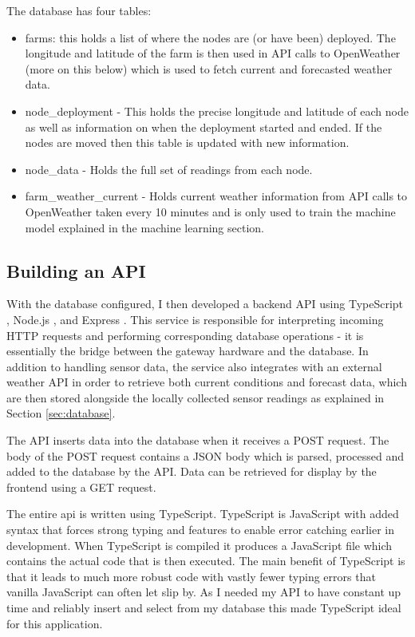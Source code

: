The database has four tables:

\begin{itemize}
    \item farms: this holds a list of where the nodes are (or have been) deployed.
          The longitude and latitude of the farm is then used in API calls to
          OpenWeather (more on this below) which is used to fetch current and
          forecasted weather data.
    \item node\_deployment - This holds the precise longitude and latitude of each
          node as well as information on when the deployment started and ended. If
          the nodes are moved then this table is updated with new information.
    \item node\_data - Holds the full set of readings from each node.
    \item farm\_weather\_current - Holds current weather information from API
          calls to OpenWeather taken every 10 minutes and is only used to
          train the machine model explained in the machine learning section.
\end{itemize}


\subsection{Building an API}

With the database configured, I then developed a backend API using TypeScript
\cite{typescript}, Node.js \cite{nodejs}, and Express \cite{express}. This
service is responsible for interpreting incoming HTTP requests and performing
corresponding database operations - it is essentially the bridge between the
gateway hardware and the database. In addition to handling sensor data, the
service also integrates with an external weather API in order to retrieve both
current conditions and forecast data, which are then stored alongside the
locally collected sensor readings as explained in Section \ref{sec:database}.

The API inserts data into the database when it receives a POST request. The body
of the POST request contains a JSON body which is parsed, processed and added to
the database by the API. Data can be retrieved for display by the frontend using
a GET request.

The entire api is written using TypeScript. TypeScript is JavaScript with added
syntax that forces strong typing and features to enable error catching earlier
in development. When TypeScript is compiled it produces a JavaScript file which
contains the actual code that is then executed. The main benefit of TypeScript
is that it leads to much more robust code with vastly fewer typing errors that
vanilla JavaScript can often let slip by. As I needed my API to have constant up
time and reliably insert and select from my database this made TypeScript ideal
for this application.

